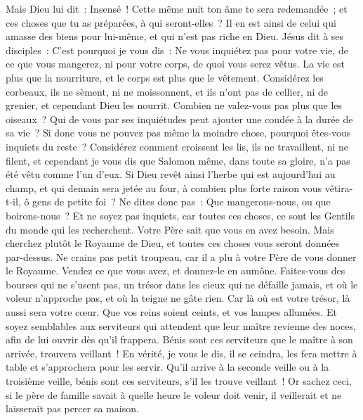 \begin{multicols}{2}
Mais Dieu lui dit~: Insensé~! Cette même nuit ton âme te sera redemandée~; et ces choses que tu as préparées, à qui seront-elles~?
Il en est ainsi de celui qui amasse des biens pour lui-même, et qui n'est pas riche en Dieu.
Jésus dit à ses disciples~: C'est pourquoi je vous dis~: Ne vous inquiétez pas pour votre vie, de ce que vous mangerez, ni pour votre corps, de quoi vous serez vêtus.
La vie est plus que la nourriture, et le corps est plus que le vêtement.
Considérez les corbeaux, ils ne sèment, ni ne moissonnent, et ils n'ont pas de cellier, ni de grenier, et cependant Dieu les nourrit. Combien ne valez-vous pas plus que les oiseaux~?
Qui de vous par ses inquiétudes peut ajouter une coudée à la durée de sa vie~?
Si donc vous ne pouvez pas même la moindre chose, pourquoi êtes-vous inquiets du reste~?
Considérez comment croissent les lis, ils ne travaillent, ni ne filent, et cependant je vous dis que Salomon même, dans toute sa gloire, n'a pas été vêtu comme l'un d'eux.
Si Dieu revêt ainsi l'herbe qui est aujourd'hui au champ, et qui demain sera jetée au four, à combien plus forte raison vous vêtira-t-il, ô gens de petite foi~?
Ne dites donc pas~: Que mangerons-nous, ou que boirons-nous~? Et ne soyez pas inquiets,
car toutes ces choses, ce sont les Gentils du monde qui les recherchent. Votre Père sait que vous en avez besoin.
Mais cherchez plutôt le Royaume de Dieu, et toutes ces choses vous seront données par-dessus.
Ne crains pas petit troupeau, car il a plu à votre Père de vous donner le Royaume.
Vendez ce que vous avez, et donnez-le en aumône. Faites-vous des bourses qui ne s'usent pas, un trésor dans les cieux qui ne défaille jamais, et où le voleur n'approche pas, et où la teigne ne gâte rien.
Car là où est votre trésor, là aussi sera votre cœur.
Que vos reins soient ceints, et vos lampes allumées.
Et soyez semblables aux serviteurs qui attendent que leur maître revienne des noces, afin de lui ouvrir dès qu'il frappera.
Bénis sont ces serviteurs que le maître à son arrivée, trouvera veillant~! En vérité, je vous le dis, il se ceindra, les fera mettre à table et s'approchera pour les servir.
Qu'il arrive à la seconde veille ou à la troisième veille, bénis sont ces serviteurs, s'il les trouve veillant~!
Or sachez ceci, si le père de famille savait à quelle heure le voleur doit venir, il veillerait et ne laisserait pas percer sa maison.

\end{multicols}
